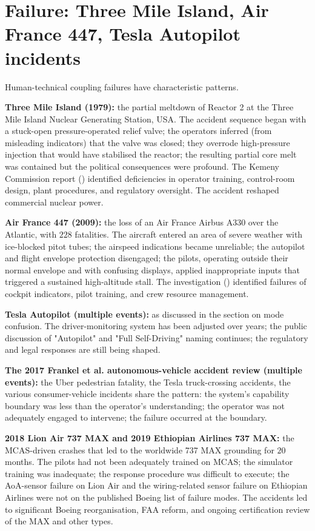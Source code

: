 \section{Failure: Three Mile Island, Air France 447, Tesla Autopilot incidents}

Human-technical coupling failures have characteristic patterns.

\textbf{Three Mile Island (1979):} the partial meltdown of Reactor 2 at the Three Mile Island Nuclear Generating Station, USA. The accident sequence began with a stuck-open pressure-operated relief valve; the operators inferred (from misleading indicators) that the valve was closed; they overrode high-pressure injection that would have stabilised the reactor; the resulting partial core melt was contained but the political consequences were profound. The Kemeny Commission report (\cite{acc:kemeny-tmi-1979}) identified deficiencies in operator training, control-room design, plant procedures, and regulatory oversight. The accident reshaped commercial nuclear power.

\textbf{Air France 447 (2009):} the loss of an Air France Airbus A330 over the Atlantic, with $228$ fatalities. The aircraft entered an area of severe weather with ice-blocked pitot tubes; the airspeed indications became unreliable; the autopilot and flight envelope protection disengaged; the pilots, operating outside their normal envelope and with confusing displays, applied inappropriate inputs that triggered a sustained high-altitude stall. The investigation (\cite{acc:bea-af447}) identified failures of cockpit indicators, pilot training, and crew resource management.

\textbf{Tesla Autopilot (multiple events):} as discussed in the section on mode confusion. The driver-monitoring system has been adjusted over years; the public discussion of "Autopilot" and "Full Self-Driving" naming continues; the regulatory and legal responses are still being shaped.

\textbf{The 2017 Frankel et al. autonomous-vehicle accident review (multiple events):} the Uber pedestrian fatality, the Tesla truck-crossing accidents, the various consumer-vehicle incidents share the pattern: the system's capability boundary was less than the operator's understanding; the operator was not adequately engaged to intervene; the failure occurred at the boundary.

\textbf{2018 Lion Air 737 MAX and 2019 Ethiopian Airlines 737 MAX:} the MCAS-driven crashes that led to the worldwide 737 MAX grounding for $20$ months. The pilots had not been adequately trained on MCAS; the simulator training was inadequate; the response procedure was difficult to execute; the AoA-sensor failure on Lion Air and the wiring-related sensor failure on Ethiopian Airlines were not on the published Boeing list of failure modes. The accidents led to significant Boeing reorganisation, FAA reform, and ongoing certification review of the MAX and other types.

